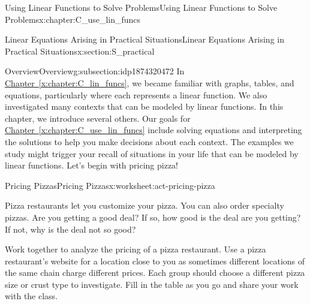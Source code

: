 \documentclass[oneside,10pt,]{book}
\newcommand{\xreffont}{\relax}
\numberwithin{equation}{chapter}
\begin{document}
\begin{chapterptx}{Using Linear Functions to Solve Problems}{}{Using Linear Functions to Solve Problems}{}{}{x:chapter:C_use_lin_funcs}
%
%
\typeout{************************************************}
\typeout{************************************************}
%
\begin{sectionptx}{Linear Equations Arising in Practical Situations}{}{Linear Equations Arising in Practical Situations}{}{}{x:section:S_practical}
%
%
\typeout{************************************************}
\typeout{************************************************}
%
\begin{subsectionptx}{Overview}{}{Overview}{}{}{g:subsection:idp1874320472}
In \hyperref[x:chapter:C_lin_funcs]{Chapter~{\xreffont\ref{x:chapter:C_lin_funcs}}}, we became familiar with graphs, tables, and equations, particularly where each represents a linear function. We also investigated many contexts that can be modeled by linear functions. In this chapter, we introduce several others. Our goals for \hyperref[x:chapter:C_use_lin_funcs]{Chapter~{\xreffont\ref{x:chapter:C_use_lin_funcs}}} include solving equations and interpreting the solutions to help you make decisions about each context. The examples we study might trigger your recall of situations in your life that can be modeled by linear functions. Let's begin with pricing pizza!%
\end{subsectionptx}
%
%
\typeout{************************************************}
\typeout{************************************************}
%
\begin{worksheet-subsection}{Pricing Pizzas}{}{Pricing Pizzas}{}{}{x:worksheet:act-pricing-pizza}
\begin{introduction}{}%
Pizza restaurants let you customize your pizza. You can also order specialty pizzas. Are you getting a good deal? If so, how good is the deal are you getting? If not, why is the deal not so good?%
\par
Work together to analyze the pricing of a pizza restaurant. Use a pizza restaurant's website for a location close to you as sometimes different locations of the same chain charge different prices. Each group should choose a different pizza size or crust type to investigate. Fill in the table as you go and share your work with the class.%
\end{introduction}%

\end{worksheet-subsection}
\end{sectionptx}
\end{chapterptx}
\end{document}
